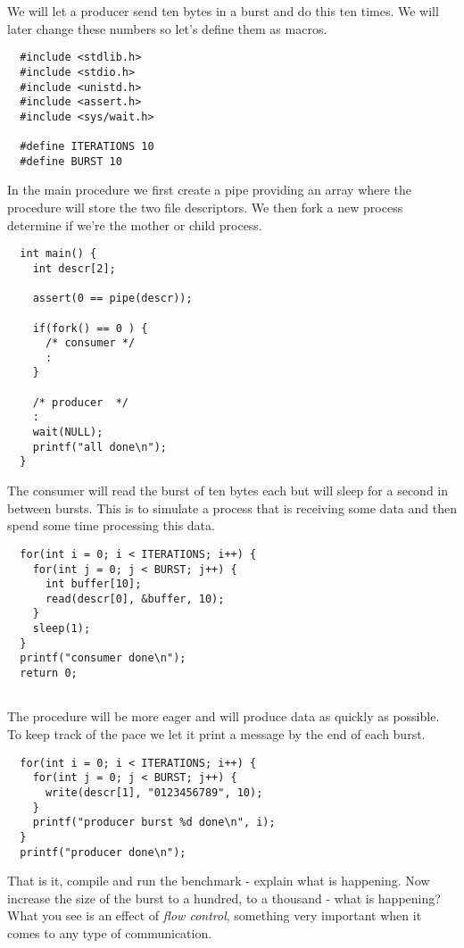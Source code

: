 \documentclass[a4paper,11pt]{article}
\begin{document}
We will let a producer send ten bytes in a burst and do this ten
times. We will later change these numbers so let's define them as
macros.

\begin{lstlisting}
  #include <stdlib.h>
  #include <stdio.h>
  #include <unistd.h>
  #include <assert.h>
  #include <sys/wait.h>

  #define ITERATIONS 10
  #define BURST 10
\end{lstlisting}

In the main procedure we first create a pipe providing an array where
the procedure will store the two file descriptors. We then fork a new
process determine if we're the mother or child process.


\begin{lstlisting}
  int main() {
    int descr[2];

    assert(0 == pipe(descr)); 

    if(fork() == 0 ) {
      /* consumer */
      :
    }

    /* producer  */
    :  
    wait(NULL);
    printf("all done\n");
  }
\end{lstlisting}

The consumer will read the burst of ten bytes each but will sleep for
a second in between bursts. This is to simulate a process that is
receiving some data and then spend some time processing this data.

\begin{lstlisting}
  for(int i = 0; i < ITERATIONS; i++) {
    for(int j = 0; j < BURST; j++) {
      int buffer[10];
      read(descr[0], &buffer, 10);
    }
    sleep(1);
  }
  printf("consumer done\n");
  return 0;
  
\end{lstlisting}

The procedure will be more eager and will produce data as quickly as
possible. To keep track of the pace we let it print a message by the
end of each burst.

\begin{lstlisting}
  for(int i = 0; i < ITERATIONS; i++) {
    for(int j = 0; j < BURST; j++) {
      write(descr[1], "0123456789", 10);
    }
    printf("producer burst %d done\n", i);
  }
  printf("producer done\n");
\end{lstlisting}

That is it, compile and run the benchmark - explain what is
happening. Now increase the size of the burst to a hundred, to a
thousand - what is happening? What you see is an effect of {\em flow
  control}, something very important when it comes to any type of
communication.
\end{document}
